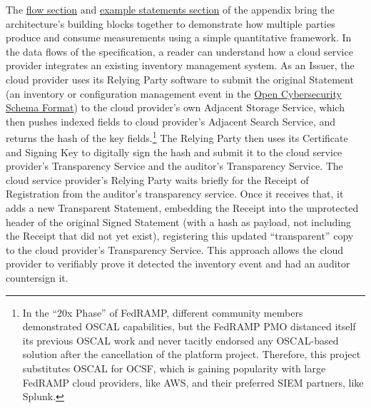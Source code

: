 \documentclass{jdf}
\begin{document}
The \href{https://github.com/aj-stein/practicum/pull/1}{flow section} and \href{https://aj-stein.github.io/conmotion/architecture.html#example-statements}{example statements section} of the appendix bring the architecture's building blocks together to demonstrate how multiple parties produce and consume measurements using a simple quantitative framework. In the data flows of the specification, a reader can understand how a cloud service provider integrates an existing inventory management system. As an Issuer, the cloud provider uses its Relying Party software to submit the original Statement (an inventory or configuration management event in the \href{https://schema.ocsf.io/}{Open Cybersecurity Schema Format}) to the cloud provider's own Adjacent Storage Service, which then pushes indexed fields to cloud provider's Adjacent Search Service, and returns the hash of the key fields.\footnote{In the ``20x Phase'' of FedRAMP, different community members demonstrated OSCAL capabilities, but the FedRAMP PMO distanced itself its previous OSCAL work and never tacitly endorsed any OSCAL-based solution after the cancellation of the platform project. Therefore, this project substitutes OSCAL for OCSF, which is gaining popularity with large FedRAMP cloud providers, like AWS, and their preferred SIEM partners, like Splunk.} The Relying Party then uses its Certificate and Signing Key to digitally sign the hash and submit it to the cloud service provider's Transparency Service and the auditor's Transparency Service. The cloud service provider's Relying Party waits briefly for the Receipt of Registration from the auditor's transparency service. Once it receives that, it adds a new Transparent Statement, embedding the Receipt into the unprotected header of the original Signed Statement (with a hash as payload, not including the Receipt that did not yet exist), registering this updated ``transparent'' copy to the cloud provider's Transparency Service. This approach allows the cloud provider to verifiably prove it detected the inventory event and had an auditor countersign it. 
\end{document}
